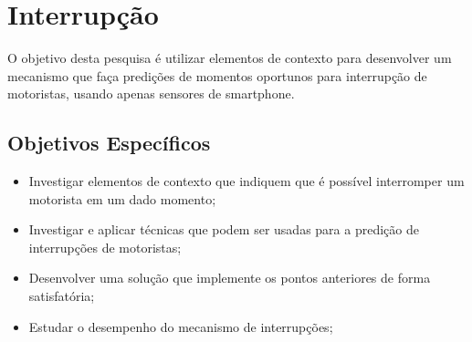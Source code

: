 \chapter{Interrupção}
\label{interrupcao}
O objetivo desta pesquisa é utilizar elementos de contexto para desenvolver um mecanismo que faça predições de
momentos oportunos para interrupção de motoristas, usando apenas sensores de smartphone.

\section{Objetivos Específicos}
\label{objetivos-esp}
\begin{itemize}
  \item Investigar elementos de contexto que indiquem que é possível interromper um motorista em um dado momento;
  \item Investigar e aplicar técnicas que podem ser usadas para a predição de interrupções de motoristas;
  \item Desenvolver uma solução que implemente os pontos anteriores de forma satisfatória;
  \item Estudar o desempenho do mecanismo de interrupções;
\end{itemize}
